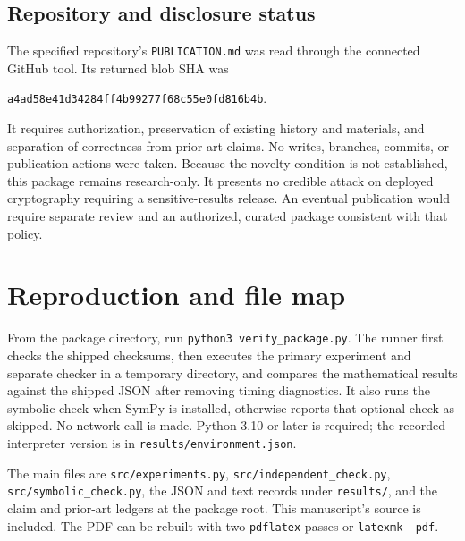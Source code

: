 \documentclass[11pt,letterpaper]{article}
\theoremstyle{definition}
\theoremstyle{remark}
\begin{document}
\subsection{Repository and disclosure status}

The specified repository's \texttt{PUBLICATION.md} was read through the connected GitHub tool. Its returned blob SHA was
\begin{center}\small\texttt{a4ad58e41d34284ff4b99277f68c55e0fd816b4b}.\end{center}
It requires authorization, preservation of existing history and materials, and separation of correctness from prior-art claims. No writes, branches, commits, or publication actions were taken. Because the novelty condition is not established, this package remains research-only. It presents no credible attack on deployed cryptography requiring a sensitive-results release. An eventual publication would require separate review and an authorized, curated package consistent with that policy.

\section*{Reproduction and file map}

From the package directory, run \texttt{python3 verify\_package.py}. The runner first checks the shipped checksums, then executes the primary experiment and separate checker in a temporary directory, and compares the mathematical results against the shipped JSON after removing timing diagnostics. It also runs the symbolic check when SymPy is installed, otherwise reports that optional check as skipped. No network call is made. Python 3.10 or later is required; the recorded interpreter version is in \texttt{results/environment.json}.

The main files are \texttt{src/experiments.py}, \texttt{src/independent\_check.py}, \texttt{src/symbolic\_check.py}, the JSON and text records under \texttt{results/}, and the claim and prior-art ledgers at the package root. This manuscript's source is included. The PDF can be rebuilt with two \texttt{pdflatex} passes or \texttt{latexmk -pdf}.
\end{document}
